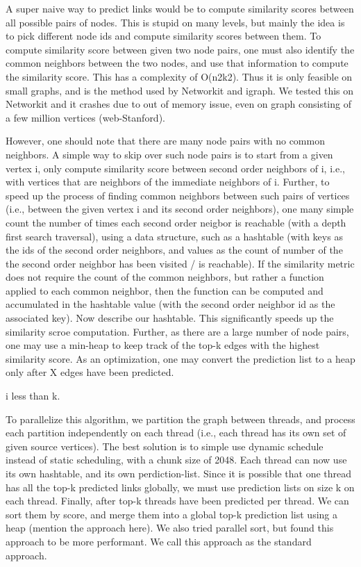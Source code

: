 A super naive way to predict links would be to compute similarity scores between all possible pairs of nodes. This is stupid on many levels, but mainly the idea is to pick different node ids and compute similarity scores between them. To compute similarity score between given two node pairs, one must also identify the common neighbors between the two nodes, and use that information to compute the similarity score. This has a complexity of O(n2k2). Thus it is only feasible on small graphs, and is the method used by Networkit and igraph. We tested this on Networkit and it crashes due to out of memory issue, even on graph consisting of a few million vertices (web-Stanford).

However, one should note that there are many node pairs with no common neighbors. A simple way to skip over such node pairs is to start from a given vertex i, only compute similarity score between second order neighbors of i, i.e., with vertices that are neighbors of the immediate neighbors of i. Further, to speed up the process of finding common neighbors between such pairs of vertices (i.e., between the given vertex i and its second order neighbors), one many simple count the number of times each second order neigbor is reachable (with a depth first search traversal), using a data structure, such as a hashtable (with keys as the ids of the second order neighbors, and values as the count of number of the the second order neighbor has been visited / is reachable). If the similarity metric does not require the count of the common neighbors, but rather a function applied to each common neighbor, then the function can be computed and accumulated in the hashtable value (with the second order neighbor id as the associated key). Now describe our hashtable. This significantly speeds up the similarity scroe computation. Further, as there are a large number of node pairs, one may use a min-heap to keep track of the top-k edges with the highest similarity score. As an optimization, one may convert the prediction list to a heap only after X edges have been predicted.

i less than k.

To parallelize this algorithm, we partition the graph between threads, and process each partition independently on each thread (i.e., each thread has its own set of given source vertices). The best solution is to simple use dynamic schedule instead of static scheduling, with a chunk size of 2048. Each thread can now use its own hashtable, and its own perdiction-list. Since it is possible that one thread has all the top-k predicted links globally, we must use prediction lists on size k on each thread. Finally, after top-k threads have been predicted per thread. We can sort them by score, and merge them into a global top-k prediction list using a heap (mention the approach here). We also tried parallel sort, but found this approach to be more performant. We call this approach as the standard approach.


